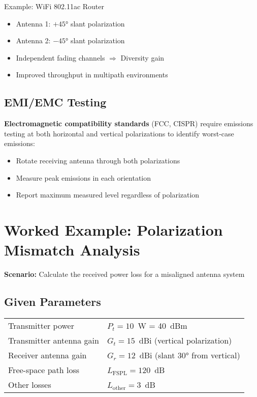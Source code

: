 \begin{calloutbox}{Example: WiFi 802.11ac Router}
\begin{itemize}
\item Antenna 1: $+45°$ slant polarization
\item Antenna 2: $-45°$ slant polarization
\item Independent fading channels $\Rightarrow$ Diversity gain
\item Improved throughput in multipath environments
\end{itemize}
\end{calloutbox}

\subsection{EMI/EMC Testing}

\textbf{Electromagnetic compatibility standards} (FCC, CISPR) require emissions testing at both horizontal and vertical polarizations to identify worst-case emissions:
\begin{itemize}
\item Rotate receiving antenna through both polarizations
\item Measure peak emissions in each orientation
\item Report maximum measured level regardless of polarization
\end{itemize}

\section{Worked Example: Polarization Mismatch Analysis}

\textbf{Scenario:} Calculate the received power loss for a misaligned antenna system

\subsection*{Given Parameters}

\begin{tabular}{@{}ll@{}}
Transmitter power & $P_t = 10$~W = 40~dBm \\
Transmitter antenna gain & $G_t = 15$~dBi (vertical polarization) \\
Receiver antenna gain & $G_r = 12$~dBi (slant $30°$ from vertical) \\
Free-space path loss & $L_{\text{FSPL}} = 120$~dB \\
Other losses & $L_{\text{other}} = 3$~dB \\
\end{tabular}

